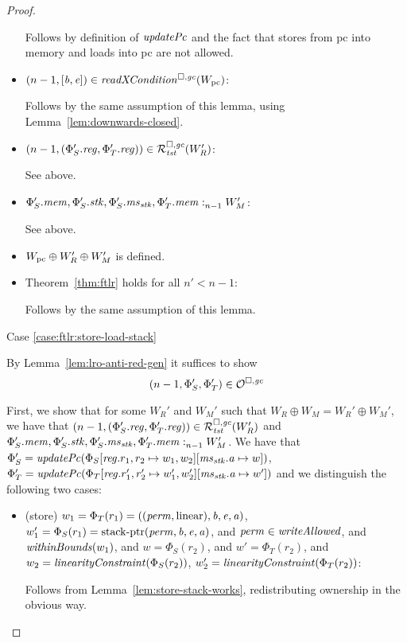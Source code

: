 \begin{proof}
\begin{itemize}
    Follows by definition of $\updPcAddr{}$ and the fact that stores from pc into memory and loads into pc are not allowed.

  \item $\npair[n-1]{[\baddr,\eaddr]} \in \xReadCond{W_\pcreg}$:

    Follows by the same assumption of this lemma, using Lemma~\ref{lem:downwards-closed}.

  \item $\npair[n-1]{(\Phi_S'.\reg,\Phi_T'.\reg)} \in \lrrg{\trust}(W_R')$:

    See above.

  \item $\memSat[n-1]{\Phi_S'.\mem,\Phi_S'.\stk,\Phi_S'.\ms_\stk,\Phi_T'.\mem}{W_M'}$:

    See above.

  \item $W_\pcreg \oplus W_R' \oplus W_M'$ is defined.

  \item Theorem~\ref{thm:ftlr} holds for all $n' < n-1$:

    Follows by the same assumption of this lemma.
  \end{itemize}

  Case \ref{case:ftlr:store-load-stack}

  By Lemma~\ref{lem:lro-anti-red-gen} it suffices to show
  \[
    \npair[n-1]{\Phi_S',\Phi_T'} \in \lro
  \]

  First, we show that for some $W_R'$ and $W_M'$ such that $W_R \oplus W_M = W_R' \oplus W_M'$, we have that $\npair[n-1]{(\Phi_S'.\reg,\Phi_T'.\reg)} \in \lrrg{\trust}(W_R')$ and $\memSat[n-1]{\Phi_S'.\mem,\Phi_S'.\stk,\Phi_S'.\ms_\stk,\Phi_T'.\mem}{W_M'}$.
  We have that $\Phi_S' = \updPcAddr{\Phi_S\updReg{r_1,r_2}{w_1,w_2}\update{\ms_\stk.\aaddr}{w}}$, $\Phi_T' = \updPcAddr{\Phi_T\updReg{r_1',r_2'}{w_1',w_2'}\update{\ms_\stk.\aaddr}{w'}}$ and we distinguish the following two cases:
  \begin{itemize}
  \item (store) $w_1 = \Phi_T(r_1) =
        ((\perm,\linear),\baddr,\eaddr,\aaddr)$, $w_1' = \Phi_S(r_1) =
        \stkptr{\perm,\baddr,\eaddr,\aaddr}$, and $\perm \in \writeAllowed{}$, and $\withinBounds{w_1}$, and $w = \Phi_S(r_2)$, and $w' = \Phi_T(r_2)$, and $w_2 = \linCons{\Phi_S(r_2)}$, $w_2' = \linCons{\Phi_T(r_2)}$:

        Follows from Lemma~\ref{lem:store-stack-works}, redistributing ownership in the obvious way.


\end{itemize}
\end{proof}

